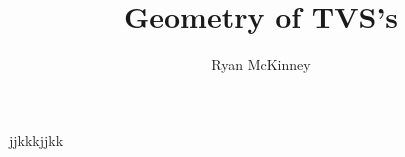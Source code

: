 \documentclass[12pt,oneside,letterpaper]{book}
\title{Geometry of TVS's}
\author{Ryan McKinney}
\begin{document}
	\newtheorem{thm}{Theorem}[section]
	\newtheorem{cor}[thm]{Corollary}jjkkkjjkk
	\newtheorem{lem}[thm]{Lemma}
	\newtheorem{prop}[thm]{Proposition}
	\newtheorem{example}[thm]{Example}
	\newtheorem{rmk}[thm]{Remark}
	\newtheorem{df}[thm]{Definition}


\frontmatter
\maketitle

\tableofcontents
\listoffigures
\listoftables


\mainmatter






\backmatter

\end{document}
